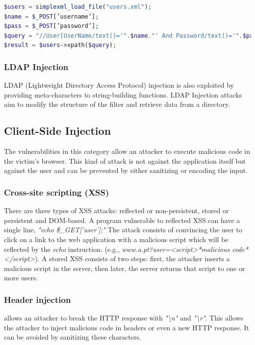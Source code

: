 \begin{lstlisting}[language=PHP,
    showstringspaces=false,
    caption={PHP code vulnerable to XPath Injection},
    label=xpath, float]
$users = simplexml_load_file("users.xml");
$name = $_POST[’username’];
$pass = $_POST[’password’];
$query = "//User[UserName/text()='".$name."' And Password/text()='".$pass."']";
$result = $users->xpath($query);
\end{lstlisting}

\subsubsection{LDAP Injection} 
LDAP (Lightweight Directory Access Protocol) injection is also exploited by providing meta-characters to string-building functions. LDAP Injection attacks aim to modify the structure of the filter and retrieve data from a directory.

\subsection{Client-Side Injection}
The vulnerabilities in this category allow an attacker to execute malicious code in the victim's browser. This kind of attack is not against the application itself but against the user and can be prevented by either sanitizing or encoding the input.
\subsubsection{Cross-site scripting (XSS)}
There are three types of XSS attacks: reflected or non-persistent, stored or persistent and DOM-based.
A program vulnerable to reflected XSS can have a single line, \textit{"echo \$\_GET['user'];"} 
The attack consists of convincing the user to click on a link to the web application with a malicious script which will be reflected by the \textit{echo} instruction. (e.g., \textit{www.a.pt?user=<script>*malicious code*</script>}).
A stored XSS consists of two steps: first, the attacker inserts a malicious script in the server, then later, the server returns that script to one or more users.

\subsubsection{Header injection} allows an attacker to break the HTTP  response with \textit{"\textbackslash n"} and \textit{"\textbackslash r"}. This allows the attacker to inject malicious code in headers or even a new HTTP  response. It can be avoided by sanitizing these characters.


